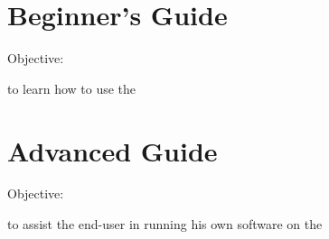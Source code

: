 \documentclass[11pt,a4paper,oneside]{book}
\begin{document}
\pagestyle{empty}



\glsaddall
\printglossaries

\cleardoublepage
{}
\printindex


\tableofcontents

\part{Beginner's Guide}

Objective:

to learn how to use the \hpc

\pagestyle{fancy}


















\part{Advanced Guide}

Objective:

to assist the end-user in running his own software on the \hpc













\appendix






\end{document}
